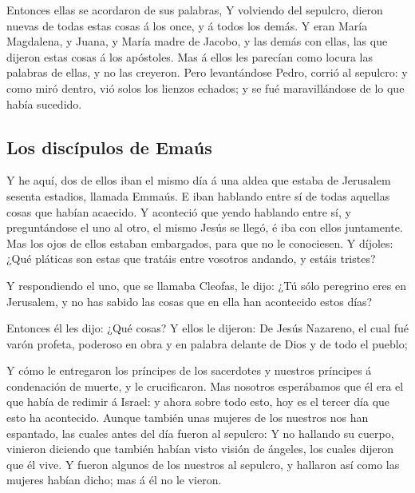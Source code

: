  Entonces ellas se acordaron de sus palabras,
 Y volviendo del sepulcro, dieron nuevas de todas estas
cosas á los once, y á todos los demás.  Y eran María
Magdalena, y Juana, y María madre de Jacobo, y las demás con ellas, las
que dijeron estas cosas á los apóstoles.  Mas á ellos les
parecían como locura las palabras de ellas, y no las creyeron.
 Pero levantándose Pedro, corrió al sepulcro: y como miró
dentro, vió solos los lienzos echados; y se fué maravillándose de lo que
había sucedido.

\hypertarget{los-discuxedpulos-de-emauxfas}{%
\subsection{Los discípulos de
Emaús}\label{los-discuxedpulos-de-emauxfas}}

 Y he aquí, dos de ellos iban el mismo día á una aldea
que estaba de Jerusalem sesenta estadios, llamada Emmaús.
 E iban hablando entre sí de todas aquellas cosas que
habían acaecido.  Y aconteció que yendo hablando entre
sí, y preguntándose el uno al otro, el mismo Jesús se llegó, é iba con
ellos juntamente.  Mas los ojos de ellos estaban
embargados, para que no le conociesen.  Y díjoles: ¿Qué
pláticas son estas que tratáis entre vosotros andando, y estáis tristes?

 Y respondiendo el uno, que se llamaba Cleofas, le dijo:
¿Tú sólo peregrino eres en Jerusalem, y no has sabido las cosas que en
ella han acontecido estos días?

 Entonces él les dijo: ¿Qué cosas? Y ellos le dijeron: De
Jesús Nazareno, el cual fué varón profeta, poderoso en obra y en palabra
delante de Dios y de todo el pueblo;

 Y cómo le entregaron los príncipes de los sacerdotes y
nuestros príncipes á condenación de muerte, y le crucificaron.
 Mas nosotros esperábamos que él era el que había de
redimir á Israel: y ahora sobre todo esto, hoy es el tercer día que esto
ha acontecido.  Aunque también unas mujeres de los
nuestros nos han espantado, las cuales antes del día fueron al sepulcro:
 Y no hallando su cuerpo, vinieron diciendo que también
habían visto visión de ángeles, los cuales dijeron que él vive.
 Y fueron algunos de los nuestros al sepulcro, y hallaron
así como las mujeres habían dicho; mas á él no le vieron.

